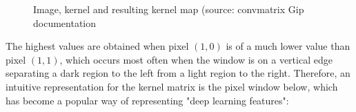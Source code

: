 \documentclass[a4paper,11pt]{article}
\begin{document}
\begin{figure}[h]
    \caption{Image, kernel and resulting kernel map (source: convmatrix Gip documentation}
    \label{materialflowChart}
\end{figure}

The highest values are obtained when pixel $(1,0)$ is of a much lower value than pixel $(1,1)$, which occurs most often when the window is on a vertical edge separating a dark region to the left from a light region to the right. Therefore, an intuitive representation for the kernel matrix is the pixel window below, which has become a popular way of representing "deep learning features":
\end{document}
